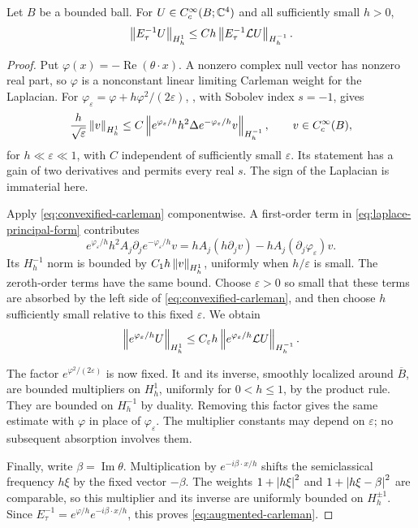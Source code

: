 \begin{proposition}
\label{prop:carleman}
Let $B$ be a bounded ball. For $U\in C_c^\infty(B;\mathbb C^4)$ and all
sufficiently small $h>0$,
\begin{equation}
\label{eq:augmented-carleman}
 \left\lVert E_\tau^{-1}U\right\rVert_{H_h^1}
 \le Ch\left\lVert E_\tau^{-1}\mathcal L U\right\rVert_{H_h^{-1}}.
\end{equation}
\end{proposition}

\begin{proof}
Put $\varphi(x)=-\operatorname{Re}(\theta\cdot x)$. A nonzero complex
null vector has nonzero real part, so $\varphi$ is a nonconstant linear
limiting Carleman weight for the Laplacian. For
$\varphi_\varepsilon=\varphi+h\varphi^2/(2\varepsilon)$,
\cite[Lemma~2.1]{SaloTzou2009}, with Sobolev index $s=-1$, gives
\begin{equation}
\label{eq:convexified-carleman}
 \frac{h}{\sqrt\varepsilon}\left\lVert v\right\rVert_{H_h^1}
 \le C\left\lVert e^{\varphi_\varepsilon/h}h^2\Delta
                 e^{-\varphi_\varepsilon/h}v\right\rVert_{H_h^{-1}},
 \qquad v\in C_c^\infty(B),
\end{equation}
for $h\ll\varepsilon\ll1$, with $C$ independent of sufficiently small
$\varepsilon$. Its statement has a gain of two derivatives and permits
every real $s$. The sign of the Laplacian is immaterial here.

Apply \eqref{eq:convexified-carleman} componentwise. A first-order term
in \eqref{eq:laplace-principal-form} contributes
\[
 e^{\varphi_\varepsilon/h}h^2A_j\partial_j
       e^{-\varphi_\varepsilon/h}v
 =hA_j(h\partial_jv)-hA_j(\partial_j\varphi_\varepsilon)v.
\]
Its $H_h^{-1}$ norm is bounded by $C_1h\left\lVert v\right\rVert_{H_h^1}$,
uniformly when $h/\varepsilon$ is small. The zeroth-order terms have
the same bound. Choose $\varepsilon>0$ so small that these terms are
absorbed by the left side of \eqref{eq:convexified-carleman}, and then
choose $h$ sufficiently small relative to this fixed $\varepsilon$.
We obtain
\[
 \left\lVert e^{\varphi_\varepsilon/h}U\right\rVert_{H_h^1}
 \le C_\varepsilon h
       \left\lVert e^{\varphi_\varepsilon/h}\mathcal L U\right\rVert_{H_h^{-1}}.
\]

The factor $e^{\varphi^2/(2\varepsilon)}$ is now fixed. It and its
inverse, smoothly localized around $\overline B$, are bounded
multipliers on $H_h^1$, uniformly for $0<h\le1$, by the product rule.
They are bounded on $H_h^{-1}$ by duality. Removing this factor gives
the same estimate with $\varphi$ in place of $\varphi_\varepsilon$.
The multiplier constants may depend on $\varepsilon$; no subsequent
absorption involves them.

Finally, write $\beta=\operatorname{Im}\theta$.
Multiplication by $e^{-i\beta\cdot x/h}$ shifts the semiclassical
frequency $h\xi$ by the fixed vector $-\beta$. The weights
$1+\left\lvert h\xi\right\rvert^2$ and $1+\left\lvert h\xi-\beta\right\rvert^2$ are comparable,
so this multiplier and its inverse are uniformly bounded on
$H_h^{\pm1}$. Since
$E_\tau^{-1}=e^{\varphi/h}e^{-i\beta\cdot x/h}$, this proves
\eqref{eq:augmented-carleman}.
\end{proof}

